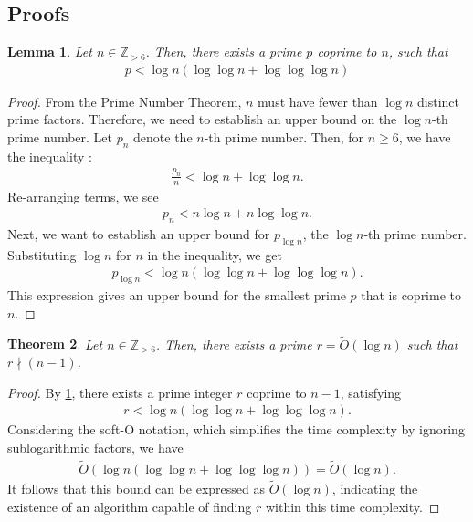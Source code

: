 \documentclass{article}
\theoremstyle{plain}
\newtheorem{theorem}{Theorem}
\newtheorem{lemma}[theorem]{Lemma}
\theoremstyle{definition}
\newcommand{\Z}{\mathbb{Z}}
\begin{document}
\subsection{Proofs}
\begin{lemma} \label{proof:leastcoprime}
Let $n \in \Z_{>6}$. Then, there exists a prime $p$ coprime to $n$, such that
\begin{align*}
    p < \log n \left( \log\log n + \log\log\log n \right)
\end{align*}
\end{lemma}
\begin{proof}
From the Prime Number Theorem, $n$ must have fewer than $\log n$ distinct prime factors. Therefore, we need to establish an upper bound on the $\log n$-th prime number. Let $p_n$ denote the $n$-th prime number. Then, for $n \geq 6$, we have the inequality \cite{rosser1941primebounds}:
\begin{align*}
    \frac{p_n}{n} < \log n + \log\log n .
\end{align*}
Re-arranging terms, we see
\begin{align*}
    p_n < n \log n + n \log\log n .
\end{align*}
Next, we want to establish an upper bound for $p_{\log n}$, the $\log n$-th prime number. Substituting $\log n$ for $n$ in the inequality, we get
\begin{align*}
p_{\log n} < \log n \left( \log\log n + \log\log\log n \right) .
\end{align*}
This expression gives an upper bound for the smallest prime $p$ that is coprime to $n$.
\end{proof}
\begin{theorem} \label{proof:leastcoprimesofto}
Let $n \in \Z_{>6}$. Then, there exists a prime $r = \tilde{O}(\log n)$ such that $r \nmid (n-1)$.
\end{theorem}
\begin{proof}
By \cref{proof:leastcoprime}, there exists a prime integer $r$ coprime to $n-1$, satisfying
\begin{align*}
    r < \log n \left( \log\log n + \log\log\log n \right) .
\end{align*}
Considering the soft-O notation, which simplifies the time complexity by ignoring sublogarithmic factors, we have
\begin{align*}
    \tilde{O}(\log n \left( \log\log n + \log\log\log n \right)) = \tilde{O}(\log n).
\end{align*}
It follows that this bound can be expressed as $\tilde{O}(\log n)$, indicating the existence of an algorithm capable of finding $r$ within this time complexity.
\end{proof}
\end{document}

